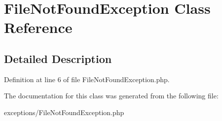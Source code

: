 \hypertarget{class_file_not_found_exception}{
\section{FileNotFoundException Class Reference}
\label{class_file_not_found_exception}
}


\subsection{Detailed Description}


Definition at line 6 of file FileNotFoundException.php.



The documentation for this class was generated from the following file:\begin{DoxyCompactItemize}
\item 
exceptions/FileNotFoundException.php\end{DoxyCompactItemize}
